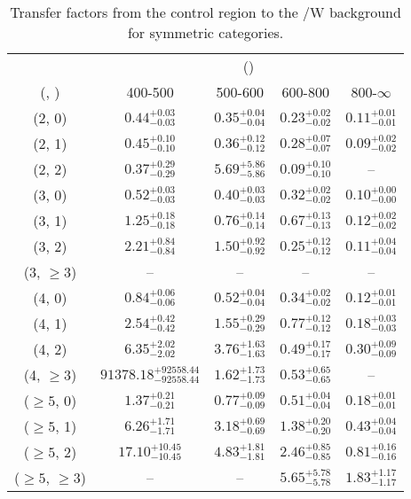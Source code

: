 \begin{table}[h!]
\tiny
\centering
\caption{Transfer factors from the \gj control region to the \ttbar/W background for symmetric categories.\label{tab:tf_gj_ttw_sym}}
\begin{tabular}
{ccccc}
	\hline\hline
	& \multicolumn{4}{c}{\scalht (\gev)} \\ 
	 (\njet,  \nb) & 400-500 & 500-600 & 600-800 & 800-$\infty$ \\ [0.8ex] 
\hline
	(2, 0) & $0.44^{+ 0.03 }_{- 0.03 }$ & $0.35^{+ 0.04 }_{- 0.04 }$ & $0.23^{+ 0.02 }_{- 0.02 }$ & $0.11^{+ 0.01 }_{- 0.01 }$ \\[0.5ex] 
	(2, 1) & $0.45^{+ 0.10 }_{- 0.10 }$ & $0.36^{+ 0.12 }_{- 0.12 }$ & $0.28^{+ 0.07 }_{- 0.07 }$ & $0.09^{+ 0.02 }_{- 0.02 }$ \\[0.5ex] 
	(2, 2) & $0.37^{+ 0.29 }_{- 0.29 }$ & $5.69^{+ 5.86 }_{- 5.86 }$ & $0.09^{+ 0.10 }_{- 0.10 }$ & -- \\[0.5ex] 
	(3, 0) & $0.52^{+ 0.03 }_{- 0.03 }$ & $0.40^{+ 0.03 }_{- 0.03 }$ & $0.32^{+ 0.02 }_{- 0.02 }$ & $0.10^{+ 0.00 }_{- 0.00 }$ \\[0.5ex] 
	(3, 1) & $1.25^{+ 0.18 }_{- 0.18 }$ & $0.76^{+ 0.14 }_{- 0.14 }$ & $0.67^{+ 0.13 }_{- 0.13 }$ & $0.12^{+ 0.02 }_{- 0.02 }$ \\[0.5ex] 
	(3, 2) & $2.21^{+ 0.84 }_{- 0.84 }$ & $1.50^{+ 0.92 }_{- 0.92 }$ & $0.25^{+ 0.12 }_{- 0.12 }$ & $0.11^{+ 0.04 }_{- 0.04 }$ \\[0.5ex] 
	(3, $\ge3$) & -- & -- & -- & -- \\[0.5ex] 
	(4, 0) & $0.84^{+ 0.06 }_{- 0.06 }$ & $0.52^{+ 0.04 }_{- 0.04 }$ & $0.34^{+ 0.02 }_{- 0.02 }$ & $0.12^{+ 0.01 }_{- 0.01 }$ \\[0.5ex] 
	(4, 1) & $2.54^{+ 0.42 }_{- 0.42 }$ & $1.55^{+ 0.29 }_{- 0.29 }$ & $0.77^{+ 0.12 }_{- 0.12 }$ & $0.18^{+ 0.03 }_{- 0.03 }$ \\[0.5ex] 
	(4, 2) & $6.35^{+ 2.02 }_{- 2.02 }$ & $3.76^{+ 1.63 }_{- 1.63 }$ & $0.49^{+ 0.17 }_{- 0.17 }$ & $0.30^{+ 0.09 }_{- 0.09 }$ \\[0.5ex] 
	(4, $\ge3$) & $91378.18^{+ 92558.44 }_{- 92558.44 }$ & $1.62^{+ 1.73 }_{- 1.73 }$ & $0.53^{+ 0.65 }_{- 0.65 }$ & -- \\[0.5ex] 
	($\ge5$, 0) & $1.37^{+ 0.21 }_{- 0.21 }$ & $0.77^{+ 0.09 }_{- 0.09 }$ & $0.51^{+ 0.04 }_{- 0.04 }$ & $0.18^{+ 0.01 }_{- 0.01 }$ \\[0.5ex] 
	($\ge5$, 1) & $6.26^{+ 1.71 }_{- 1.71 }$ & $3.18^{+ 0.69 }_{- 0.69 }$ & $1.38^{+ 0.20 }_{- 0.20 }$ & $0.43^{+ 0.04 }_{- 0.04 }$ \\[0.5ex] 
	($\ge5$, 2) & $17.10^{+ 10.45 }_{- 10.45 }$ & $4.83^{+ 1.81 }_{- 1.81 }$ & $2.46^{+ 0.85 }_{- 0.85 }$ & $0.81^{+ 0.16 }_{- 0.16 }$ \\[0.5ex] 
	($\ge5$, $\ge3$) & -- & -- & $5.65^{+ 5.78 }_{- 5.78 }$ & $1.83^{+ 1.17 }_{- 1.17 }$ \\[0.5ex] 
	\hline
	\hline
\end{tabular}
\end{table}
